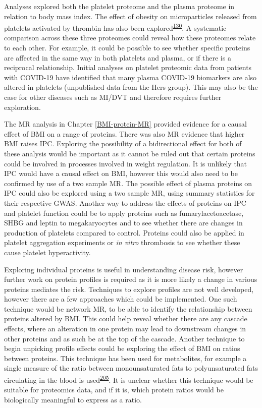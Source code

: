 \documentclass[11pt,twoside]{bristolthesis}
\begin{document}
Analyses explored both the platelet proteome and the plasma proteome in relation to body mass index. The effect of obesity on microparticles released from platelets activated by thrombin has also been explored\textsuperscript{\protect\hyperlink{ref-Grande2019}{130}}. A systematic comparison across these three proteomes could reveal how these proteomes relate to each other. For example, it could be possible to see whether specific proteins are affected in the same way in both platelets and plasma, or if there is a reciprocal relationship. Initial analyses on platelet proteomic data from patients with COVID-19 have identified that many plasma COVID-19 biomarkers are also altered in platelets (unpublished data from the Hers group). This may also be the case for other diseases such as MI/DVT and therefore requires further exploration.

The MR analysis in Chapter \ref{BMI-protein-MR} provided evidence for a causal effect of BMI on a range of proteins. There was also MR evidence that higher BMI raises IPC. Exploring the possibility of a bidirectional effect for both of these analysis would be important as it cannot be ruled out that certain proteins could be involved in processes involved in weight regulation. It is unlikely that IPC would have a causal effect on BMI, however this would also need to be confirmed by use of a two sample MR. The possible effect of plasma proteins on IPC could also be explored using a two sample MR, using summary statistics for their respective GWAS. Another way to address the effects of proteins on IPC and platelet function could be to apply proteins such as fumarylacetoacetase, SHBG and leptin to megakaryocytes and to see whether there are changes in production of platelets compared to control. Proteins could also be applied in platelet aggregation experiments or \emph{in vitro} thrombosis to see whether these cause platelet hyperactivity.

Exploring individual proteins is useful in understanding disease risk, however further work on protein profiles is required as it is more likely a change in various proteins mediates the risk. Techniques to explore profiles are not well developed, however there are a few approaches which could be implemented. One such technique would be network MR, to be able to identify the relationship between proteins altered by BMI. This could help reveal whether there are any cascade effects, where an alteration in one protein may lead to downstream changes in other proteins and as such be at the top of the cascade. Another technique to begin unpicking profile effects could be exploring the effect of BMI on ratios between proteins. This technique has been used for metabolites, for example a single measure of the ratio between monounsaturated fats to polyunsaturated fats circulating in the blood is used\textsuperscript{\protect\hyperlink{ref-Carayol2017c}{205}}. It is unclear whether this technique would be suitable for proteomics data, and if it is, which protein ratios would be biologically meaningful to express as a ratio.
\end{document}
